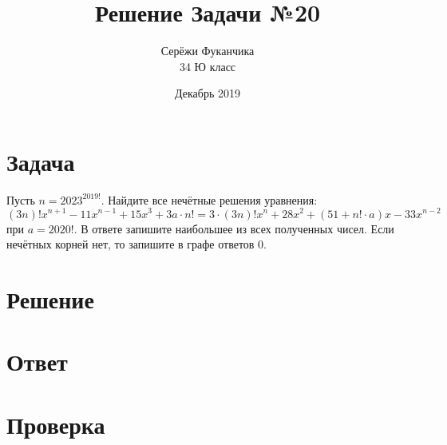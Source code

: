 \documentclass{article}
\title{Решение Задачи №20}
\author{Серёжи Фуканчика\\34 Ю класс}
\date{Декабрь 2019}
\begin{document}
\maketitle

\section{Задача}
Пусть $n=2023^{2019!}$. Найдите все нечётные решения уравнения:
$$(3n)!x^{n+1}-11x^{n-1}+15x^3+3a\cdot{}n!=3\cdot{}(3n)!x^n+28x^2+(51+n!\cdot{}a)x-33x^{n-2}$$
при $a=2020!$. В ответе запишите наибольшее из всех полученных чисел. Если нечётных корней нет, то запишите в графе ответов $0$.

\section{Решение}

\section{Ответ}

\section{Проверка}
\end{document}
